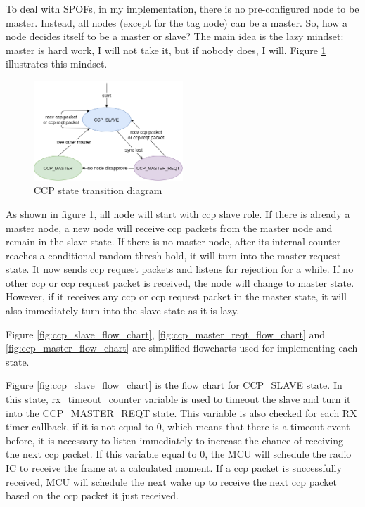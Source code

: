 \documentclass[\main/thesis.tex]{subfiles}
\begin{document}
To deal with SPOFs, in my implementation, there is no pre-configured node to be master. Instead, all nodes (except for the tag node) can be a master. So, how a node decides itself to be a master or slave? The main idea is the lazy mindset: master is hard work, I will not take it, but if nobody does, I will. Figure \ref{fig:CCP_state_diagram} illustrates this mindset.

\begin{figure}[H]
    \begin{center}
        \includegraphics[width=0.5\textwidth]{ccp_state_diagram.png}
    \end{center}
    \caption{CCP state transition diagram}
    \label{fig:CCP_state_diagram}
\end{figure}

As shown in figure \ref{fig:CCP_state_diagram}, all node will start with ccp slave role. If there is already a master node, a new node will receive ccp packets from the master node and remain in the slave state. If there is no master node, after its internal counter reaches a conditional random thresh hold, it will turn into the master request state. It now sends ccp request packets and listens for rejection for a while. If no other ccp or ccp request packet is received, the node will change to master state. However, if it receives any ccp or ccp request packet in the master state, it will also immediately turn into the slave state as it is lazy.

Figure \ref{fig:ccp_slave_flow_chart}, \ref{fig:ccp_master_reqt_flow_chart} and \ref{fig:ccp_master_flow_chart} are simplified flowcharts used for implementing each state.

Figure \ref{fig:ccp_slave_flow_chart} is the flow chart for CCP\_SLAVE state. In this state, rx\_timeout\_counter variable is used to timeout the slave and turn it into the CCP\_MASTER\_REQT state.
This variable is also checked for each RX timer callback, if it is not equal to 0, which means that there is a timeout event before, it is necessary to listen immediately to increase the chance of receiving the next ccp packet. If this variable equal to 0, the MCU will schedule the radio IC to receive the frame at a calculated moment. If a ccp packet is successfully received, MCU will schedule the next wake up to receive the next ccp packet based on the ccp packet it just received. 
\end{document}
